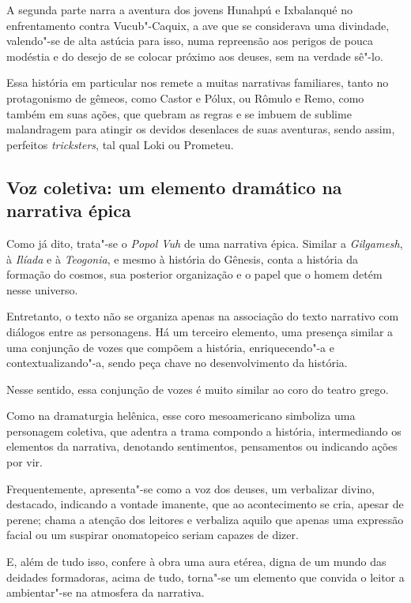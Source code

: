 \documentclass[11pt]{extarticle}
\begin{document}
A segunda parte narra a aventura dos jovens Hunahpú e Ixbalanqué no
enfrentamento contra Vucub"-Caquix, a ave que se considerava uma
divindade, valendo"-se de alta astúcia para isso, numa repreensão aos
perigos de pouca modéstia e do desejo de se colocar próximo aos deuses,
sem na verdade sê"-lo.




Essa história em particular nos remete a muitas narrativas familiares,
tanto no protagonismo de gêmeos, como Castor e Pólux, ou Rômulo e Remo,
como também em suas ações, que quebram as regras e se imbuem de sublime
malandragem para atingir os devidos desenlaces de suas aventuras, sendo
assim, perfeitos \textit{tricksters}, tal qual Loki ou Prometeu.

\subsection{Voz coletiva: um elemento dramático na narrativa épica}

Como já dito, trata"-se o \textit{Popol Vuh} de uma narrativa épica. Similar a
\textit{Gilgamesh}, à \textit{Ilíada} e à \textit{Teogonia}, e mesmo à história do Gênesis, conta a
história da formação do cosmos, sua posterior organização e o papel que
o homem detém nesse universo.

Entretanto, o texto não se organiza apenas na associação do texto
narrativo com diálogos entre as personagens. Há um terceiro elemento,
uma presença similar a uma conjunção de vozes que compõem a história,
enriquecendo"-a e contextualizando"-a, sendo peça chave no desenvolvimento
da história.

Nesse sentido, essa conjunção de vozes é muito similar ao coro do teatro
grego.

Como na dramaturgia helênica, esse coro mesoamericano simboliza uma
personagem coletiva, que adentra a trama compondo a história,
intermediando os elementos da narrativa, denotando sentimentos,
pensamentos ou indicando ações por vir.

Frequentemente, apresenta"-se como a voz dos deuses, um verbalizar
divino, destacado, indicando a vontade imanente, que ao acontecimento se
cria, apesar de perene; chama a atenção dos leitores e verbaliza aquilo
que apenas uma expressão facial ou um suspirar onomatopeico seriam
capazes de dizer.

E, além de tudo isso, confere à obra uma aura etérea, digna de um mundo
das deidades formadoras, acima de tudo, torna"-se um elemento que convida
o leitor a ambientar"-se na atmosfera da narrativa.
\end{document}
